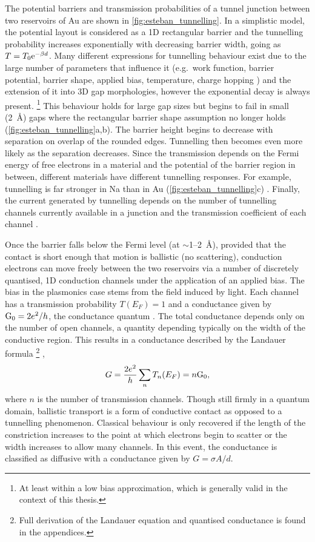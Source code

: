 \documentclass{article}
\begin{document}
The potential barriers and transmission probabilities of a tunnel junction between two reservoirs of Au are shown in \autoref{fig:esteban_tunnelling}. In a simplistic model, the potential layout is considered as a 1D rectangular barrier and the tunnelling probability increases exponentially with decreasing barrier width, going as \cite{simmons1963generalized, blanco2006stm} $T = T_0 \mathrm{e}^{-\beta d}$. Many different expressions for tunnelling behaviour exist due to the large number of parameters that influence it (e.g.\ work function, barrier potential, barrier shape, applied bias, temperature, charge hopping \cite{blanco2006stm}) and the extension of it into 3D gap morphologies, however the exponential decay is always present.%
\footnote{At least within a low bias approximation, which is generally valid in the context of this thesis.}
This behaviour holds for large gap sizes but begins to fail in small (\SI{2}{\angstrom}) gaps where the rectangular barrier shape assumption no longer holds (\autoref{fig:esteban_tunnelling}a,b). The barrier height begins to decrease with separation on overlap of the rounded edges. Tunnelling then becomes even more likely as the separation decreases. Since the transmission depends on the Fermi energy of free electrons in a material and the potential of the barrier region in between, different materials have different tunnelling responses. For example, tunnelling is far stronger in Na than in Au (\autoref{fig:esteban_tunnelling}c) \cite{esteban2015}. Finally, the current generated by tunnelling depends on the number of tunnelling channels currently available in a junction and the transmission coefficient of each channel \cite{zuloaga2009}. %

Once the barrier falls below the Fermi level (at $\sim$1--\SI{2}{\angstrom}), provided that the contact is short enough that motion is ballistic (no scattering), conduction electrons can move freely between the two reservoirs via a number of discretely quantised, 1D conduction channels under the application of an applied bias. The bias in the plasmonics case stems from the field induced by light. Each channel has a transmission probability $T(E_F)=1$ and a conductance given by $\mathrm{G_{0}} = 2e^2/h$, the conductance quantum \cite{landauer1957spatial}. The total conductance depends only on the number of open channels, a quantity depending typically on the width of the conductive region. This results in a conductance described by the Landauer formula%
\footnote{Full derivation of the Landauer equation and quantised conductance is found in the appendices.} \cite{landauer1957spatial},
\begin{equation}
G = \frac{2e^2}{h}\sum_n T_n(E_F) = n\mathrm{G_{0}}, \label{eq:landauer}
\end{equation}
where $n$ is the number of transmission channels. Though still firmly in a quantum domain, ballistic transport is a form of conductive contact as opposed to a tunnelling phenomenon. Classical behaviour is only recovered if the length of the constriction increases to the point at which electrons begin to scatter or the width increases to allow many channels. In this event, the conductance is classified as diffusive with a conductance given by $G=\sigma A/d$.
\end{document}
